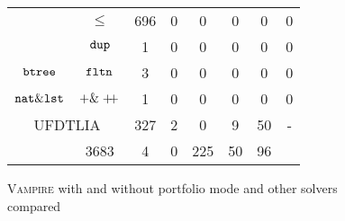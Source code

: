 \begin{figure}
\begin{tabular}[c]{c|c|c|c|c|c|c|c}
		& $\leq$ & 696 & 0 & 0 & 0 & 0 & 0\\
		& $\mathtt{dup}$ & 1 & 0 & 0 & 0 & 0 & 0\\
		\hline
		\multirow{1}{*}{$\mathtt{btree}$} & $\mathtt{fltn}$ & 3 & 0 & 0 & 0 & 0 & 0\\
		\hline
		\multirow{1}{*}{$\mathtt{nat}\&\mathtt{lst}$} & $+\&\mathrel{ +\hspace{-1mm}+ }$ & 1 & 0 & 0 & 0 & 0 & 0\\
		\hline
		\multicolumn{2}{c|}{UFDTLIA} & 327 & \cellcolor{gray!20!white}2 & 0 & \cellcolor{gray!20!white}9 & \cellcolor{gray!20!white}50 & -\\
		\hhline{|=|=|=|=|=|=|=|=|}
		\multicolumn{2}{c|}{All} & 3683 & \cellcolor{gray!20!white}4 & 0 & \cellcolor{gray!20!white}225 & \cellcolor{gray!20!white}50 & \cellcolor{gray!20!white}96\\
		\hline
	\end{tabular}
	\caption{\textsc{Vampire} with and without portfolio mode and other solvers compared}
	\label{fig:comparison3}
\end{figure}
